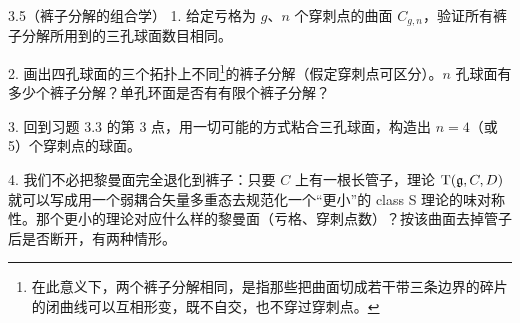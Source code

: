 \begin{exercise}{3.5（裤子分解的组合学）}
1. 给定亏格为 $g$、$n$ 个穿刺点的曲面 $C_{g,n}$，验证所有裤子分解所用到的三孔球面数目相同。

2. 画出四孔球面的三个拓扑上不同\footnote{在此意义下，两个裤子分解相同，是指那些把曲面切成若干带三条边界的碎片的闭曲线可以互相形变，既不自交，也不穿过穿刺点。}的裤子分解（假定穿刺点可区分）。$n$ 孔球面有多少个裤子分解？单孔环面是否有有限个裤子分解？

3. 回到习题 3.3 的第 3 点，用一切可能的方式粘合三孔球面，构造出 $n=4$（或 5）个穿刺点的球面。

4. 我们不必把黎曼面完全退化到裤子：只要 $C$ 上有一根长管子，理论 $\mathrm{T}(\mathfrak{g},C,D)$ 就可以写成用一个弱耦合矢量多重态去规范化一个“更小”的 class S 理论的味对称性。那个更小的理论对应什么样的黎曼面（亏格、穿刺点数）？按该曲面去掉管子后是否断开，有两种情形。
\end{exercise}

